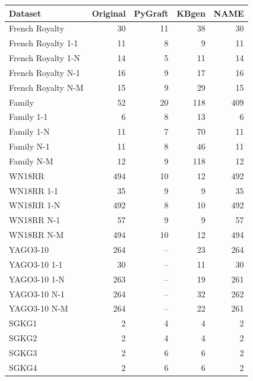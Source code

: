 \begin{tabular}{lrrrr}
\toprule
Dataset & Original & PyGraft & KBgen & NAME \\
\midrule
French Royalty & 30 & 11 & 38 & 30 \\
French Royalty 1-1 & 11 & 8 & 9 & 11 \\
French Royalty 1-N & 14 & 5 & 11 & 14 \\
French Royalty N-1 & 16 & 9 & 17 & 16 \\
French Royalty N-M & 15 & 9 & 29 & 15 \\
\midrule
Family & 52 & 20 & 118 & 409 \\
Family 1-1 & 6 & 8 & 13 & 6 \\
Family 1-N & 11 & 7 & 70 & 11 \\
Family N-1 & 11 & 8 & 46 & 11 \\
Family N-M & 12 & 9 & 118 & 12 \\
\midrule
WN18RR & 494 & 10 & 12 & 492 \\
WN18RR 1-1 & 35 & 9 & 9 & 35 \\
WN18RR 1-N & 492 & 8 & 10 & 492 \\
WN18RR N-1 & 57 & 9 & 9 & 57 \\
WN18RR N-M & 494 & 10 & 12 & 494 \\
\midrule
YAGO3-10 & 264 & – & 23 & 264 \\
YAGO3-10 1-1 & 30 & – & 11 & 30 \\
YAGO3-10 1-N & 263 & – & 19 & 261 \\
YAGO3-10 N-1 & 264 & – & 32 & 262 \\
YAGO3-10 N-M & 264 & – & 22 & 261 \\
\midrule
SGKG1 & 2 & 4 & 4 & 2 \\
SGKG2 & 2 & 4 & 4 & 2 \\
SGKG3 & 2 & 6 & 6 & 2 \\
SGKG4 & 2 & 6 & 6 & 2 \\
\bottomrule
\end{tabular}
